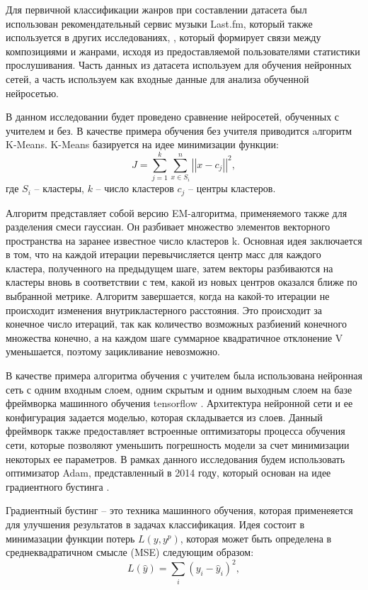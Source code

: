Для первичной классификации жанров при составлении датасета был использован рекомендательный сервис музыки Last.fm, который также используется в других исследованиях, \cite{lastfm}, который
формирует связи между композициями и жанрами, исходя из предоставляемой пользователями статистики прослушивания.
Часть данных из датасета используем для обучения нейронных сетей, 
а часть используем как входные данные для анализа обученной нейросетью. 

В данном исследовании будет проведено сравнение
нейросетей, обученных с учителем и без. В качестве примера обучения без учителя приводится aлгоритм K-Means.
K-Means базируется на идее минимизации функции:
\begin{equation}
	J = \sum_{j=1}^k \sum_{x \in S_i}^n \left|\left| x - c_j\right|\right|^2,
\end{equation}
где $S_i$ -- кластеры, $k$ -- число кластеров $c_j$ -- центры кластеров.

Алгоритм представляет собой версию EM-алгоритма, применяемого также для разделения смеси гауссиан. Он разбивает множество элементов векторного пространства на заранее известное число кластеров k.
Основная идея заключается в том, что на каждой итерации перевычисляется центр масс для каждого кластера, полученного на предыдущем шаге, затем векторы разбиваются на кластеры вновь в соответствии с тем, какой из новых центров оказался ближе по выбранной метрике.
Алгоритм завершается, когда на какой-то итерации не происходит изменения внутрикластерного расстояния. Это происходит за конечное число итераций, так как количество возможных разбиений конечного множества конечно, а на каждом шаге суммарное квадратичное отклонение V уменьшается, поэтому зацикливание невозможно.

В качестве примера алгоритма обучения с учителем была использована нейронная сеть с одним входным слоем, одним скрытым и одним выходным слоем на базе фреймворка машинного обучения tensorflow \cite{tensorflow}.
Архитектура нейронной сети и ее конфигурация задается моделью, которая складывается из слоев. 
Данный фреймворк также предоставляет встроенные оптимизаторы процесса обучения сети, которые позволяют уменьшить погрешность модели за счет минимизации некоторых ее параметров. В рамках данного исследования будем использовать оптимизатор Adam, представленный в 2014 году, который основан на идее градиентного бустинга \cite{adam}.

Градиентный бустинг -- это техника машинного обучения, которая применеяется для улучшения результатов в задачах классификация. Идея состоит в минимазации функции потерь $L(y, y^p)$, которая может быть определена в среднеквадратичном смысле (MSE) следующим образом:
\begin{equation}
	L(\hat y) = \sum_{i} (y_i - \hat y _i)^2,
\end{equation} 


